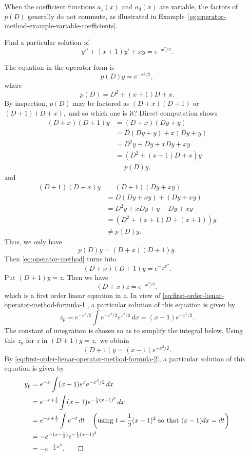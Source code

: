 When the coefficient functions $a_1(x)$ and $a_0(x)$ are variable,   the factors of $p(D)$ generally do not commute, as illustrated in Example~\ref{eg:operator-method-example-variable-coefficients}.
\begin{example}\label{eg:operator-method-example-variable-coefficients}
	Find a particular solution of 
\[y''+(x+1)y'+xy=e^{-x^2/2}.\]
\end{example}	
\begin{solution}
	The equation in the operator form is 
	\begin{equation}\label{eq:operator-method}
		p(D)y =e^{-x^2/2},
	\end{equation}where 
	\[p(D)= D^2+(x+1)D+x.\] By inspection,  $p(D)$ may be factored  as \((D+x)(D+1)\) or \((D+1)(D+x),\) and so which one is it?  Direct computation shows 
	\[\begin{split}
		(D+x)(D+1)y &= (D+x)(Dy+y)\\
		&= D(Dy+y)+x(Dy+y)\\
		&= D^2y+Dy+xDy+xy\\
		&= (D^2+(x+1)D+x)y\\
		&=p(D)y,
	\end{split}\]
	and
	\[\begin{split}
		(D+1)(D+x)y &= (D+1)(Dy+xy)\\
		&= D(Dy+xy)+(Dy+xy)\\
		&= D^2y+xDy+y+Dy+xy\\
		&= (D^2+(x+1)D+(x+1))y\\
		&\ne p(D)y.
	\end{split}\]	
	Thus, we only have
	\[p(D)y= (D+x)(D+1)y.\] Then  \eqref{eq:operator-method} turns into
	\[(D+x)(D+1)y= e^{-\frac{1}{2}x^2}.\]
	Put $(D+1)y =z.$ Then we have 
	\[(D+x)z=e^{-x^2/2},\] which is a first order linear equation in $z.$ 
	In view of \eqref{eq:first-order-lienar-operator-method-formula-1}, a particular solution of this equation is given by
             	\[z_p=e^{-x^2/2}\int e^{-x^2/2} e^{x^2/2}\,dx= (x-1) e^{-x^2/2}.\]  The constant of integration is chosen so as to simplify the  integral below.  Using this $z_p$ for $z$ in $(D+1)y =z,$ we obtain
	\[(D+1)y = (x-1) e^{-x^2/2}.\] By \eqref{eq:first-order-lienar-operator-method-formula-2}, a particular solution of this equation is given by
	\[\begin{split}
		y_p &= e^{-x} \int (x-1)e^x e^{-x^2/2}\, dx\\
		& = e^{-x+\frac{1}{2}} \int (x-1)e^{-\frac{1}{2}(x-1)^2}\, dx\\
		&=e^{-x+\frac{1}{2}} \int e^{-t}\,dt\quad \left(\mbox{using } t= \frac{1}{2}(x-1)^2 \mbox{ so that }(x-1)dx =dt\right)\\
		&=-e^{-(x-\frac{1}{2})} e^{-\frac{1}{2}(x-1)^2}\\
		&=-e^{-\frac{1}{2}x^2}.\qedhere
	\end{split} \]
\end{solution}

